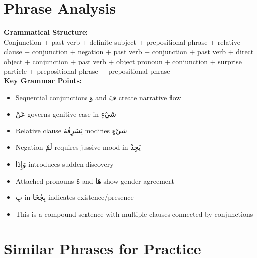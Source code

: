 \documentclass[letterpaper,12pt]{article}
\begin{document}
\section{Phrase Analysis}
\begin{tcolorbox}[colback=boxcolor,colframe=headercolor,breakable]
\textbf{Grammatical Structure:}\\
Conjunction + past verb + definite subject + prepositional phrase + relative clause + conjunction + negation + past verb + conjunction + past verb + direct object + conjunction + past verb + object pronoun + conjunction + surprise particle + prepositional phrase + prepositional phrase \\

\textbf{Key Grammar Points:}
\begin{itemize}
\item Sequential conjunctions \textarabic{وَ} and \textarabic{فَ} create narrative flow
\item \textarabic{عَنْ} governs genitive case in \textarabic{شَيْءٍ}
\item Relative clause \textarabic{يَسْرِقُهُ} modifies \textarabic{شَيْءٍ}
\item Negation \textarabic{لَمْ} requires jussive mood in \textarabic{يَجِدْ}
\item \textarabic{وَإِذَا} introduces sudden discovery
\item Attached pronouns \textarabic{هُ} and \textarabic{هَا} show gender agreement
\item \textarabic{بِ} in \textarabic{بِجُحَا} indicates existence/presence
\item This is a compound sentence with multiple clauses connected by conjunctions
\end{itemize}
\end{tcolorbox}

\section{Similar Phrases for Practice}
\end{document}
